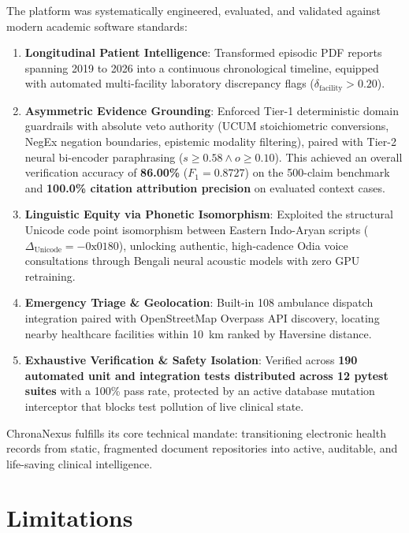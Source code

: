 The platform was systematically engineered, evaluated, and validated against modern academic software standards:
\begin{enumerate}
    \item \textbf{Longitudinal Patient Intelligence}: Transformed episodic PDF reports spanning 2019 to 2026 into a continuous chronological timeline, equipped with automated multi-facility laboratory discrepancy flags ($\delta_{\text{facility}} > 0.20$).
    \item \textbf{Asymmetric Evidence Grounding}: Enforced Tier-1 deterministic domain guardrails with absolute veto authority (UCUM stoichiometric conversions, NegEx negation boundaries, epistemic modality filtering), paired with Tier-2 neural bi-encoder paraphrasing ($s \ge 0.58 \land o \ge 0.10$). This achieved an overall verification accuracy of \textbf{86.00\%} ($F_1 = 0.8727$) on the 500-claim benchmark and \textbf{100.0\% citation attribution precision} on evaluated context cases.
    \item \textbf{Linguistic Equity via Phonetic Isomorphism}: Exploited the structural Unicode code point isomorphism between Eastern Indo-Aryan scripts ($\Delta_{\text{Unicode}} = -0\text{x}0180$), unlocking authentic, high-cadence Odia voice consultations through Bengali neural acoustic models with zero GPU retraining.
    \item \textbf{Emergency Triage \& Geolocation}: Built-in 108 ambulance dispatch integration paired with OpenStreetMap Overpass API discovery, locating nearby healthcare facilities within 10~km ranked by Haversine distance.
    \item \textbf{Exhaustive Verification \& Safety Isolation}: Verified across \textbf{190 automated unit and integration tests distributed across 12 pytest suites} with a 100\% pass rate, protected by an active database mutation interceptor that blocks test pollution of live clinical state.
\end{enumerate}

ChronaNexus fulfills its core technical mandate: transitioning electronic health records from static, fragmented document repositories into active, auditable, and life-saving clinical intelligence.


\section{Limitations}
\label{sec:limitations}

